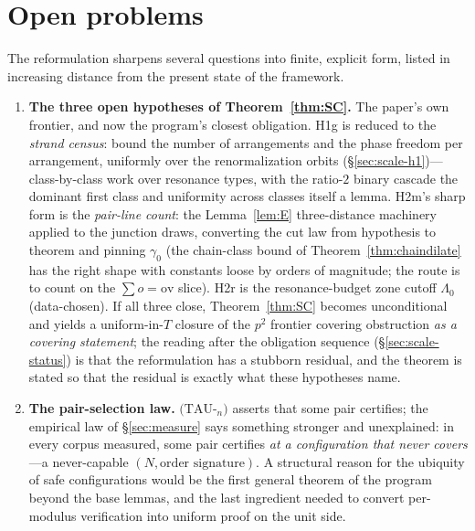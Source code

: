 
\section{Open problems}\label{sec:open}

The reformulation sharpens several questions into finite, explicit form,
listed in increasing distance from the present
state of the framework.

\begin{enumerate}[leftmargin=1.7em,itemsep=4pt]

\item \textbf{The three open hypotheses of Theorem~\ref{thm:SC}.} The paper's
  own frontier, and now the program's closest obligation. H1g is reduced
  to the \emph{strand census}: bound the number of arrangements and the
  phase freedom per arrangement, uniformly over the renormalization
  orbits (\S\ref{sec:scale-h1})---class-by-class work over resonance
  types, with the ratio-$2$ binary cascade the dominant first class and
  uniformity across classes itself a lemma. H2m's sharp form is the
  \emph{pair-line count}: the Lemma~\ref{lem:E} three-distance
  machinery applied to the junction draws, converting the cut law from
  hypothesis to theorem and pinning $\gamma_0$ (the chain-class bound of
  Theorem~\ref{thm:chaindilate} has the right shape with constants loose
  by orders of magnitude; the route is to count on the
  $\sum o=\mathrm{ov}$ slice). H2r is the resonance-budget zone cutoff
  $\Lambda_0$ (data-chosen). If all three close, Theorem~\ref{thm:SC}
  becomes unconditional and yields a uniform-in-$T$ closure of the $p^2$
  frontier covering obstruction \emph{as a covering statement}; the
  reading after the obligation sequence
  (\S\ref{sec:scale-status}) is that the reformulation has a stubborn
  residual, and the theorem is stated so that the residual is exactly
  what these hypotheses name.

\item \textbf{The pair-selection law.} $(\mathrm{TAU}$-$_n)$ asserts that
  some pair certifies; the empirical law of \S\ref{sec:measure} says
  something stronger and unexplained: in every corpus measured, some pair
  certifies \emph{at a configuration that never covers}---a never-capable
  $(N,\text{order signature})$. A structural reason for the ubiquity of
  safe configurations would be the first general theorem of the program
  beyond the base lemmas, and the last ingredient needed to convert
  per-modulus verification into uniform proof on the unit side.


\end{enumerate}
